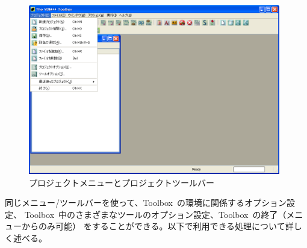 \documentclass[\pformat,12pt]{jarticle}
\newcommand{\Toolbox}{Toolbox}
\begin{document}
\begin{figure}[tbh]
\begin{center}
\mbox{}
\includegraphics[width=11cm]{projectMenuToolbar-pp.png}
\caption{プロジェクトメニューとプロジェクトツールバー}
\label{fig:projectMenuToolbar}
\end{center}
\end{figure}


同じメニュー/ツールバーを使って、\Toolbox\ の環境に関係するオプション設定、
\Toolbox\ 中のさまざまなツールのオプション設定、\Toolbox\ の終了（メニューからのみ可能）
をすることができる。以下で利用できる処理について詳しく述べる。
\end{document}
